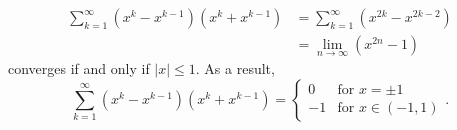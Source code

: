 \begin{Exercise}
\begin{solution}
\begin{align*}
\sum_{k=1}^{\infty}\left(x^k-x^{k-1}\right)\left(x^k+x^{k-1}\right) 
&= \sum_{k=1}^{\infty}\left(x^{2k}-x^{2k-2}\right) \\
&= \lim_{n\to\infty}\left(x^{2n}-1\right)
\end{align*}
converges if and only if $|x| \leq 1$.
As a result, 
$$
\sum_{k=1}^{\infty}\left(x^k-x^{k-1}\right)\left(x^k+x^{k-1}\right) 
= \begin{cases} 
0 & \mbox{for } x=\pm1 \\
-1 & \mbox{for } x\in(-1,1)
\end{cases}.
$$
\end{solution}
\end{Exercise}